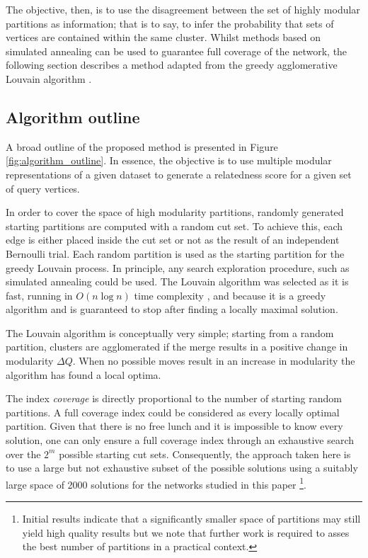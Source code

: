 \documentclass[sigconf]{acmart}
\begin{document}
The objective, then, is to use the disagreement between the set of highly modular partitions as information; that is to say, to infer the probability that sets of vertices are contained within the same cluster.
Whilst methods based on simulated annealing can be used to guarantee full coverage of the network, the following section describes a method adapted from the greedy agglomerative Louvain algorithm \cite{blondel2008fast}.

\subsection{Algorithm outline}
A broad outline of the proposed method is presented in Figure \ref{fig:algorithm_outline}.
In essence, the objective is to use multiple modular representations of a given dataset to generate a relatedness score for a given set of query vertices.

In order to cover the space of high modularity partitions, randomly generated starting partitions are computed with a random cut set.
To achieve this, each edge is either placed inside the cut set or not as the result of an independent Bernoulli trial. 
Each random partition is used as the starting partition for the greedy Louvain process.
In principle, any search exploration procedure, such as simulated annealing \cite{good2010performance} could be used.
The Louvain algorithm was selected as it is fast, running in $O(n \log n)$ time complexity \cite{blondel2008fast}, and because it is a greedy algorithm and is guaranteed to stop after finding a locally maximal solution.

The Louvain algorithm is conceptually very simple; starting from a random partition, clusters are agglomerated if the merge results in a positive change in modularity $\Delta Q$.
When no possible moves result in an increase in modularity the algorithm has found a local optima.

The index \textit{coverage} is directly proportional to the number of starting random partitions.
A full coverage index could be considered as every locally optimal partition.
Given that there is no free lunch and it is impossible to know every solution, one can only ensure a full coverage index through an exhaustive search over the $2^m$ possible starting cut sets.
Consequently, the approach taken here is to use a large but not exhaustive subset of the possible solutions using a suitably large space of 2000 solutions for the networks studied in this paper
\footnote{Initial results indicate that a significantly smaller space of partitions may still yield high quality results but we note that further work is required to asses the best number of partitions in a practical context.}.
\end{document}
